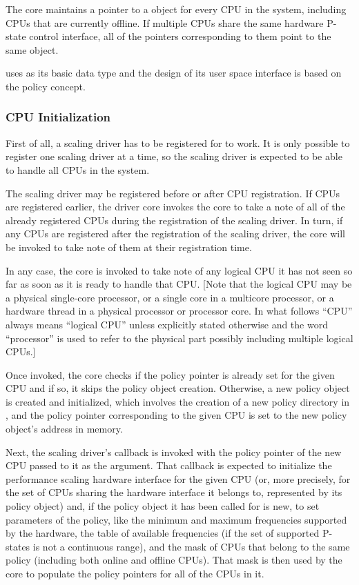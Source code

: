 \documentclass[a4paper,8pt,english]{sphinxmanual}
\begin{document}
The  core maintains a pointer to a  object for
every CPU in the system, including CPUs that are currently offline.  If multiple
CPUs share the same hardware P-state control interface, all of the pointers
corresponding to them point to the same  object.

 uses  as its basic data type and the design
of its user space interface is based on the policy concept.


\subsubsection{CPU Initialization}
\label{admin-guide/pm/cpufreq:cpu-initialization}
First of all, a scaling driver has to be registered for  to work.
It is only possible to register one scaling driver at a time, so the scaling
driver is expected to be able to handle all CPUs in the system.

The scaling driver may be registered before or after CPU registration.  If
CPUs are registered earlier, the driver core invokes the  core to
take a note of all of the already registered CPUs during the registration of the
scaling driver.  In turn, if any CPUs are registered after the registration of
the scaling driver, the  core will be invoked to take note of them
at their registration time.

In any case, the  core is invoked to take note of any logical CPU it
has not seen so far as soon as it is ready to handle that CPU.  {[}Note that the
logical CPU may be a physical single-core processor, or a single core in a
multicore processor, or a hardware thread in a physical processor or processor
core.  In what follows ``CPU'' always means ``logical CPU'' unless explicitly stated
otherwise and the word ``processor'' is used to refer to the physical part
possibly including multiple logical CPUs.{]}

Once invoked, the  core checks if the policy pointer is already set
for the given CPU and if so, it skips the policy object creation.  Otherwise,
a new policy object is created and initialized, which involves the creation of
a new policy directory in , and the policy pointer corresponding to
the given CPU is set to the new policy object's address in memory.

Next, the scaling driver's  callback is invoked with the policy
pointer of the new CPU passed to it as the argument.  That callback is expected
to initialize the performance scaling hardware interface for the given CPU (or,
more precisely, for the set of CPUs sharing the hardware interface it belongs
to, represented by its policy object) and, if the policy object it has been
called for is new, to set parameters of the policy, like the minimum and maximum
frequencies supported by the hardware, the table of available frequencies (if
the set of supported P-states is not a continuous range), and the mask of CPUs
that belong to the same policy (including both online and offline CPUs).  That
mask is then used by the core to populate the policy pointers for all of the
CPUs in it.
\end{document}
